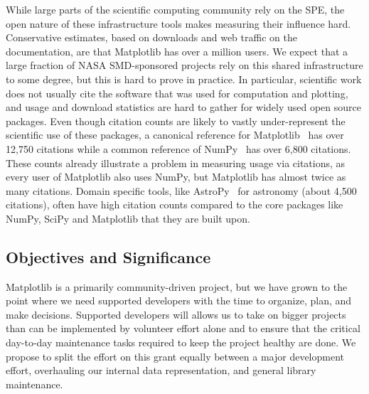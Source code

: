 \documentclass[12pt]{article}
\numberwithin{page}{section}
\begin{document}
While large parts of the scientific computing community rely on the
SPE, the open nature of these infrastructure tools makes measuring
their influence hard.  Conservative estimates, based on downloads and
web traffic on the documentation, are that Matplotlib has over a
million users.  We expect that a large fraction of NASA SMD-sponsored
projects rely on this shared infrastructure to some degree, but this
is hard to prove in practice.  In particular, scientific work does not
usually cite the software that was used for computation and plotting,
and usage and download statistics are hard to gather for widely used
open source packages.  Even though citation counts are likely to
vastly under-represent the scientific use of these packages, a
canonical reference for Matplotlib~\cite{Hunter:2007} has over 12,750
citations while a common reference of NumPy~\cite{walt2011numpy} has
over 6,800 citations. These counts already illustrate a problem in
measuring usage via citations, as every user of Matplotlib also uses
NumPy, but Matplotlib has almost twice as many citations.  Domain
specific tools, like AstroPy~\cite{robitaille2013astropy} for
astronomy (about 4,500 citations), often have high citation counts
compared to the core packages like NumPy, SciPy and Matplotlib that
they are built upon.


\subsection{Objectives and Significance}





Matplotlib is a primarily community-driven project, but we have grown
to the point where we need supported developers with the time to
organize, plan, and make decisions.  Supported developers will allows
us to take on bigger projects than can be implemented by volunteer
effort alone and to ensure that the critical day-to-day maintenance
tasks required to keep the project healthy are done.  We propose to
split the effort on this grant equally between a major development
effort, overhauling our internal data representation, and general
library maintenance.
\end{document}
